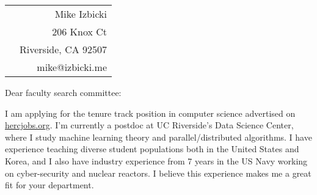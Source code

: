 \documentclass[12pt]{article}
\begin{document}
\noindent
\hspace{-0.13in}
\begin{tabularx}{1.03\textwidth}{Xr}
 & Mike Izbicki \\
 & 206 Knox Ct\\
 & Riverside, CA 92507\\
 & mike@izbicki.me\\
\end{tabularx}

\vspace{0.2in}

\setlength{\parskip}{15pt plus4mm minus3mm}

\noindent
Dear faculty search committee:

\noindent
I am applying for the tenure track position in computer science advertised on \mbox{\url{hercjobs.org}.}
I'm currently a postdoc at UC Riverside's Data Science Center,
where I study machine learning theory and parallel/distributed algorithms.
I have experience teaching diverse student populations both in the United States and Korea,
and I also have industry experience from 7 years in the US Navy working on cyber-security and nuclear reactors.
I believe this experience makes me a great fit for your department.
\end{document}
